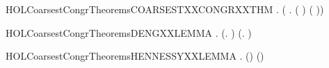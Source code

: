 \newcommand{\HOLCoarsestCongrTheoremsCOARSESTXXCONGRXXRL}{\UseVerbatim{HOLCoarsestCongrTheoremsCOARSESTXXCONGRXXRL}}
\begin{SaveVerbatim}{HOLCoarsestCongrTheoremsCOARSESTXXCONGRXXTHM}
\HOLTokenTurnstile{} \HOLSymConst{\HOLTokenForall{}} .
         \HOLSymConst{\HOLTokenConj{}}   \HOLSymConst{\HOLTokenImp{}}
       (   \HOLSymConst{\HOLTokenEquiv{}} \HOLSymConst{\HOLTokenForall{}}.  ( \HOLSymConst{\ensuremath{+}} ) ( \HOLSymConst{\ensuremath{+}} ))
\end{SaveVerbatim}
\newcommand{\HOLCoarsestCongrTheoremsCOARSESTXXCONGRXXTHM}{\UseVerbatim{HOLCoarsestCongrTheoremsCOARSESTXXCONGRXXTHM}}
\begin{SaveVerbatim}{HOLCoarsestCongrTheoremsDENGXXLEMMA}
\HOLTokenTurnstile{} \HOLSymConst{\HOLTokenForall{}} .
          \HOLSymConst{\HOLTokenImp{}}
       (\HOLSymConst{\HOLTokenExists{}}.  \HOLTokenTransBegin\HOLConst{\ensuremath{\tau}}\HOLTokenTransEnd {} \HOLSymConst{\HOLTokenConj{}}   ) \HOLSymConst{\HOLTokenDisj{}}
       (\HOLSymConst{\HOLTokenExists{}}.  \HOLTokenTransBegin\HOLConst{\ensuremath{\tau}}\HOLTokenTransEnd {} \HOLSymConst{\HOLTokenConj{}}   ) \HOLSymConst{\HOLTokenDisj{}}   
\end{SaveVerbatim}
\newcommand{\HOLCoarsestCongrTheoremsDENGXXLEMMA}{\UseVerbatim{HOLCoarsestCongrTheoremsDENGXXLEMMA}}
\begin{SaveVerbatim}{HOLCoarsestCongrTheoremsHENNESSYXXLEMMA}
\HOLTokenTurnstile{} \HOLSymConst{\HOLTokenForall{}} .
          \HOLSymConst{\HOLTokenEquiv{}}
          \HOLSymConst{\HOLTokenDisj{}}   (\HOLConst{\ensuremath{\tau}}) \HOLSymConst{\HOLTokenDisj{}}  (\HOLConst{\ensuremath{\tau}}) 
\end{SaveVerbatim}

